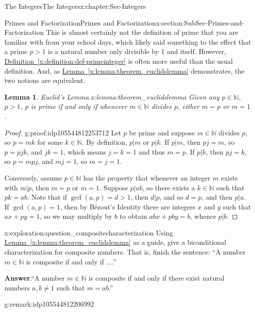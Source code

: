 \documentclass[oneside,10pt,]{book}
\newcommand{\blocktitlefont}{\relax}
\newcommand{\xreffont}{\relax}
\numberwithin{equation}{section}
\def\N{{\mathbb N}}
\newtheorem{lemma}[theorem]{Lemma}
\begin{document}
\begin{chapterptx}{The Integers}{}{The Integers}{}{}{x:chapter:Sec-Integers}
\begin{sectionptx}{Primes and Factorization}{}{Primes and Factorization}{}{}{x:section:SubSec-Primes-and-Factorization}
This is almost certainly not the definition of prime that you are familiar with from your school days, which likely said something to the effect that a prime \(p > 1\) is a natural number only divisible by 1 and itself. However, \hyperref[x:definition:def-primeinteger]{Definition~{\xreffont\ref{x:definition:def-primeinteger}}} is often more useful than the usual definition. And, as \hyperref[x:lemma:theorem_euclidslemma]{Lemma~{\xreffont\ref{x:lemma:theorem_euclidslemma}}} demonstrates, the two notions are equivalent.%
\begin{lemma}{Euclid's Lemma.}{}{x:lemma:theorem_euclidslemma}%
Given any \(p\in \N\), \(p > 1\), \(p\) is prime if and only if whenever \(m\in \N\) divides \(p\), either \(m = p\) or \(m = 1\).%
\end{lemma}
\begin{proof}{}{g:proof:idp105544812253712}
Let \(p\) be prime and suppose \(m\in \N\) divides \(p\), so \(p = mk\) for some \(k\in \N\). By definition, \(p|m\) or \(p|k\). If \(p|m\), then \(pj = m\), so \(p = pjk\), and \(jk=1\), which means \(j=k=1\) and thus \(m=p\). If \(p|k\), then \(pj=k\), so \(p = mpj\), and \(mj=1\), so \(m = j = 1\).%
\par
Conversely, assume \(p\in \N\) has the property that whenever an integer \(m\) exists with \(m|p\), then \(m= p\) or \(m =1\). Suppose \(p|ab\), so there exists a \(k\in\N\) such that \(pk = ab\). Note that if \(\gcd(a,p) = d > 1\), then \(d|p\), and so \(d = p\), and then \(p|a\). If \(\gcd(a,p) = 1\), then by Bézout's Identity there are integers \(x\) and \(y\) such that \(ax + py = 1\), so we may multiply by \(b\) to obtain \(abx + pby = b\), whence \(p|b\).%
\end{proof}
\begin{exploration}{}{x:exploration:question_compositecharacterization}%
Using \hyperref[x:lemma:theorem_euclidslemma]{Lemma~{\xreffont\ref{x:lemma:theorem_euclidslemma}}} as a guide, give a biconditional characterization for composite numbers. That is, finish the sentence: ``A number \(m\in\N\) is composite if and only if ....''%
\par\smallskip%
\noindent\textbf{\blocktitlefont Answer}.\hypertarget{g:answer:idp105544812205072}{}\quad{}``A number \(m\in\N\) is composite if and only if there exist natural numbers \(a,b\ne 1\) such that \(m = ab\).''%
\end{exploration}%
\begin{remark}{}{g:remark:idp105544812206992}%

\end{remark}
\end{sectionptx}
\end{chapterptx}
\end{document}
